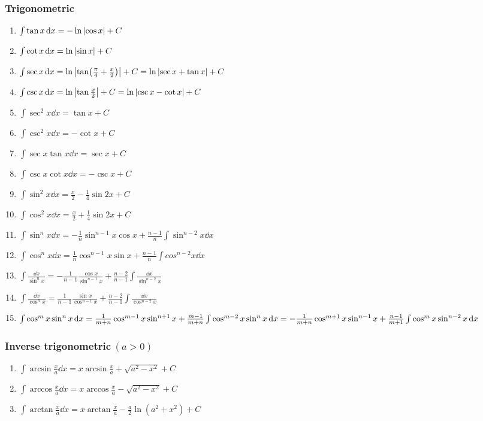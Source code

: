 \subsubsection{Trigonometric}
	\begin{enumerate}
		\item$\int\tan x\dd{x}=-\ln\abs{\cos x}+C$
		\item$\int\cot x\dd{x}=\ln\abs{\sin x}+C$
		\item$\int\sec x\dd{x}=\ln\abs{\tan(\frac{\pi}{4}+\frac{x}{2})}+C=\ln\abs{\sec x+\tan x}+C$
		\item$\int\csc x\dd{x}=\ln\abs{\tan\frac{x}{2}}+C=\ln\abs{\csc x-\cot x}+C$
		\item$\int\sec^2x\dd{x}=\tan x+C$
		\item$\int\csc^2x\dd{x}=-\cot x+C$
		\item$\int\sec x \tan x\dd{x}=\sec x+C$
		\item$\int\csc x \cot x\dd{x}=-\csc x+C$
		\item$\int\sin^2x\dd{x}=\frac{x}{2}-\frac{1}{4}\sin 2x+C$
		\item$\int\cos^2x\dd{x}=\frac{x}{2}+\frac{1}{4}\sin 2x+C$
		\item$\int\sin^nx\dd{x}=-\frac{1}{n}\sin^{n-1}x\cos x+\frac{n-1}{n}\int\sin^{n-2}x\dd{x}$
		\item$\int\cos^nx\dd{x}=\frac{1}{n}\cos^{n-1}x\sin x+\frac{n-1}{n}\int cos^{n-2}x\dd{x}$
		\item$\int\frac{\dd{x}}{\sin^nx}=-\frac{1}{n-1}\frac{\cos x}{\sin^{n-1}x}+\frac{n-2}{n-1}\int\frac{\dd{x}}{\sin^{n-2}x}$
		\item$\int\frac{\dd{x}}{\cos^nx}=\frac{1}{n-1}\frac{\sin x}{\cos^{n-1}x}+\frac{n-2}{n-1}\int\frac{\dd{x}}{\cos^{n-2}x}$
		\item$\int\cos^m x\sin^n x\dd{x}=\frac{1}{m+n}\cos^{m-1}x\sin^{n+1}x+\frac{m-1}{m+n}\int\cos^{m-2}x\sin^n x\dd{x}=-\frac{1}{m+n}\cos^{m+1}x\sin^{n-1}x+\\\frac{n-1}{m+1}\int\cos^m x\sin^{n-2}x\dd{x}$
	\end{enumerate}
\subsubsection{Inverse trigonometric$\ (a>0)$}
	\begin{enumerate}
		\item$\int\arcsin\frac{x}{a}\dd{x}=x\arcsin\frac{x}{a}+\sqrt{a^2-x^2}+C$
		\item$\int\arccos\frac{x}{a}\dd{x}=x\arccos\frac{x}{a}-\sqrt{a^2-x^2}+C$
		\item$\int\arctan\frac{x}{a}\dd{x}=x\arctan\frac{x}{a}-\frac{a}{2}\ln(a^2+x^2)+C$
	\end{enumerate}
